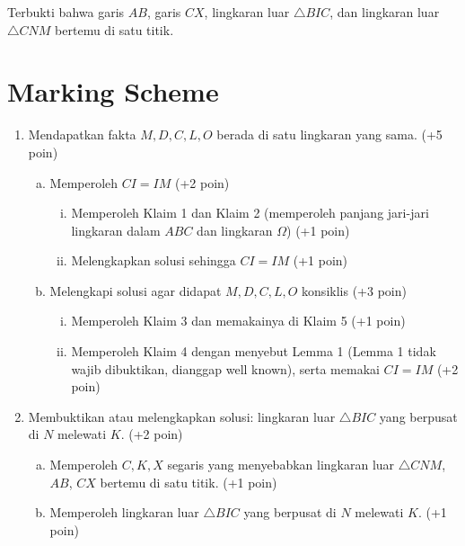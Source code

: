     Terbukti bahwa garis $AB$, garis $CX$, lingkaran luar $\triangle BIC$, dan lingkaran luar $\triangle CNM$ bertemu di satu titik. 

    \newpage

    \section{Marking Scheme}
	\begin{enumerate}[1)]
	\item Mendapatkan fakta $M,D,C,L,O$ berada di satu lingkaran yang sama. (+5 poin)
    \begin{enumerate}[(a)]
        \item Memperoleh $CI=IM$ (+2 poin)
        \begin{enumerate}[(i)]
            \item Memperoleh Klaim 1 dan Klaim 2 (memperoleh panjang jari-jari lingkaran dalam $ABC$ dan lingkaran $\Omega$) (+1 poin)
            \item Melengkapkan solusi sehingga $CI=IM$ (+1 poin)
        \end{enumerate}
        \item Melengkapi solusi agar didapat $M,D,C,L,O$ konsiklis (+3 poin)
        \begin{enumerate}[(i)]
            \item Memperoleh Klaim 3 dan memakainya di Klaim 5 (+1 poin)
            \item Memperoleh Klaim 4 dengan menyebut Lemma 1 (Lemma 1 tidak wajib dibuktikan, dianggap well known), serta memakai $CI=IM$ (+2 poin)
        \end{enumerate}
    \end{enumerate}
	\item Membuktikan atau melengkapkan solusi: lingkaran luar $\triangle BIC$ yang berpusat di $N$ melewati $K$. (+2 poin)
    \begin{enumerate}[(a)]
        \item Memperoleh $C,K,X$ segaris yang menyebabkan lingkaran luar $\triangle CNM$, $AB$, $CX$ bertemu di satu titik. (+1 poin)
        \item Memperoleh lingkaran luar $\triangle BIC$ yang berpusat di $N$ melewati $K$. (+1 poin)
    \end{enumerate}
	\end{enumerate}
